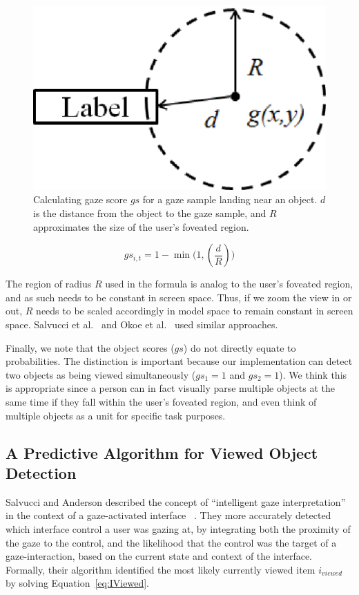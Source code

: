 \begin{figure}[htb]
  \centering
  \includegraphics[width=0.6\linewidth]{images/gazeScoreFig3.eps}
  \caption{Calculating gaze score $gs$ for a gaze sample landing near an object. $d$ is the distance from the object to the gaze sample, and $R$ approximates the size of the user's foveated region.}
	\label{fig:gazeScoreFig3}
\end{figure}

\begin{equation}
gs_{i,t} = 1 - \min \Big (1, (\frac{d}{R}) \Big )
\label{eq:GS}
\end{equation}

The region of radius $R$ used in the formula is analog to the user's foveated region, and as such needs to be constant in screen space. Thus, if we zoom the view in or out, $R$ needs to be scaled accordingly in model space to remain constant in screen space.  Salvucci et al.~\cite{Sal00} and Okoe et al.~\cite{Okoe14} used similar approaches.

Finally, we note that the object scores ($gs$) do not directly equate to probabilities. The distinction is important because our implementation can detect two objects as being viewed simultaneously ($gs_1 = 1$ and $gs_2=1$). We think this is appropriate since a person can in fact visually parse multiple objects at the same time if they fall within the user's foveated region, and even think of multiple objects as a unit for specific task purposes.



\subsection{A Predictive Algorithm for Viewed Object Detection}
\label{sec:MehthodsIntelligentAlgorithm}

Salvucci and Anderson described the concept of ``intelligent gaze interpretation'' in the context of a gaze-activated interface ~\cite{Sal00}. They more accurately detected which interface control a user was gazing at, by integrating both the proximity of the gaze to the control, and the likelihood that the control was the target of a gaze-interaction, based on the current state and context of the interface. Formally, their algorithm identified the most likely currently viewed item $i_{viewed}$ by solving Equation~\ref{eq:IViewed}.

